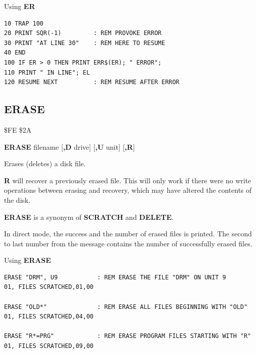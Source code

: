 \begin{description}[leftmargin=2cm,style=nextline]
\item [Example:]  Using {\bf ER}

\begin{tcolorbox}[colback=black,coltext=white]
\verbatimfont{\codefont}
\begin{verbatim}
10 TRAP 100
20 PRINT SQR(-1)         : REM PROVOKE ERROR
30 PRINT "AT LINE 30"    : REM HERE TO RESUME
40 END
100 IF ER > 0 THEN PRINT ERR$(ER); " ERROR";
110 PRINT " IN LINE"; EL
120 RESUME NEXT          : REM RESUME AFTER ERROR
\end{verbatim}
\end{tcolorbox}
\end{description}


\newpage
\subsection{ERASE}
\label{BASIC 65 Commands!ERASE}
\begin{description}[leftmargin=2cm,style=nextline]
\item [Token:]    \$FE \$2A

\item [Format:]   {\bf ERASE} filename [{\bf,D} drive] [{\bf,U} unit] [{\bf,R}]

\item [Usage:]    Erases (deletes) a disk file.

                  \filenamedefinition

                  \drivedefinition

                  \unitdefinition

                  {\bf R} will recover a previously erased file. This will only work if there were no write operations between erasing and recovery, which may have altered the contents of the disk.

\item [Remarks:]  {\bf ERASE} is a synonym of {\bf SCRATCH} and {\bf DELETE}.

                  In direct mode, the success and the number of erased files is printed. The second to last number from the message contains the number of successfully erased files.

\item [Examples:] Using {\bf ERASE}

\begin{tcolorbox}[colback=black,coltext=white]
\verbatimfont{\codefont}
\begin{verbatim}
ERASE "DRM", U9           : REM ERASE THE FILE "DRM" ON UNIT 9
01, FILES SCRATCHED,01,00

ERASE "OLD*"              : REM ERASE ALL FILES BEGINNING WITH "OLD"
01, FILES SCRATCHED,04,00

ERASE "R*=PRG"            : REM ERASE PROGRAM FILES STARTING WITH "R"
01, FILES SCRATCHED,09,00
\end{verbatim}
\end{tcolorbox}
\end{description}

